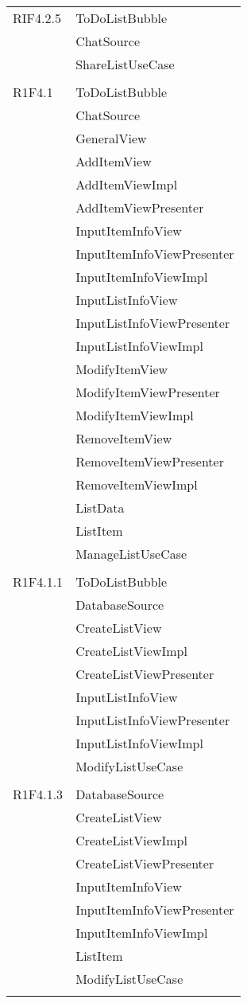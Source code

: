 \begin{center}
\begin{longtable}{|p{7cm}|p{5cm}|}
		RIF4.2.5 & ToDoListBubble \\ & ChatSource \\ & ShareListUseCase \\ & \\ \hline
		R1F4.1 & ToDoListBubble \\ & ChatSource \\ & GeneralView \\ & AddItemView \\ & AddItemViewImpl \\ & AddItemViewPresenter \\ & InputItemInfoView \\ & InputItemInfoViewPresenter \\ & InputItemInfoViewImpl \\ & InputListInfoView \\ & InputListInfoViewPresenter \\ & InputListInfoViewImpl \\ & ModifyItemView \\ & ModifyItemViewPresenter \\ & ModifyItemViewImpl \\ & RemoveItemView \\ & RemoveItemViewPresenter \\ & RemoveItemViewImpl \\ & ListData \\ & ListItem \\ & ManageListUseCase \\ & \\ \hline
		R1F4.1.1 & ToDoListBubble \\ & DatabaseSource \\ & CreateListView \\ & CreateListViewImpl \\ & CreateListViewPresenter \\ & InputListInfoView \\ & InputListInfoViewPresenter \\ & InputListInfoViewImpl \\ & ModifyListUseCase \\ & \\ \hline
		R1F4.1.3 & DatabaseSource \\ & CreateListView \\ & CreateListViewImpl \\ & CreateListViewPresenter \\ & InputItemInfoView \\ & InputItemInfoViewPresenter \\ & InputItemInfoViewImpl \\ & ListItem \\ & ModifyListUseCase \\ & \\ \hline

\end{longtable}
\end{center}
